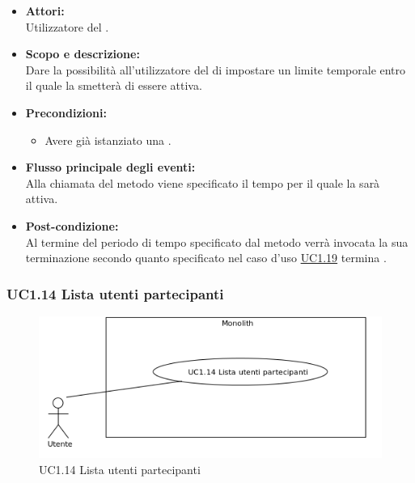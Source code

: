 \begin{itemize}
	\item \textbf{Attori:}
	\\Utilizzatore del .
	\item \textbf{Scopo e descrizione:} 
	\\Dare la possibilità all'utilizzatore del  di impostare un limite temporale entro il quale la  smetterà di essere attiva.
	\item \textbf{Precondizioni:}
	\begin{itemize}
		\item Avere già istanziato una .
	\end{itemize}
	\item \textbf{Flusso principale degli eventi:}
	\\Alla chiamata del metodo viene specificato il tempo per il quale la  sarà attiva.
	\item \textbf{Post-condizione:}
	\\Al termine del periodo di tempo specificato dal metodo verrà invocata la sua terminazione secondo quanto specificato nel caso d'uso \hyperref[UC1.19]{UC1.19} termina .
\end{itemize}

\subsubsection{UC1.14 Lista utenti partecipanti} \label{UC1.14}

\begin{figure}[H]
	\centering
	\includegraphics[width=15cm]{../../documenti/AnalisiDeiRequisiti/Diagrammi_img/uc1_14.png}
	\caption{UC1.14 Lista utenti partecipanti}
\end{figure}

